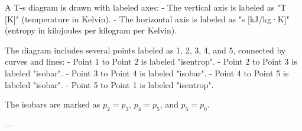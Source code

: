 A T-s diagram is drawn with labeled axes:  
- The vertical axis is labeled as "T [K]" (temperature in Kelvin).  
- The horizontal axis is labeled as "s [kJ/kg·K]" (entropy in kilojoules per kilogram per Kelvin).  

The diagram includes several points labeled as 1, 2, 3, 4, and 5, connected by curves and lines:  
- Point 1 to Point 2 is labeled "isentrop".  
- Point 2 to Point 3 is labeled "isobar".  
- Point 3 to Point 4 is labeled "isobar".  
- Point 4 to Point 5 is labeled "isobar".  
- Point 5 to Point 1 is labeled "isentrop".  

The isobars are marked as \( p_2 = p_3 \), \( p_4 = p_5 \), and \( p_5 = p_0 \).  

---